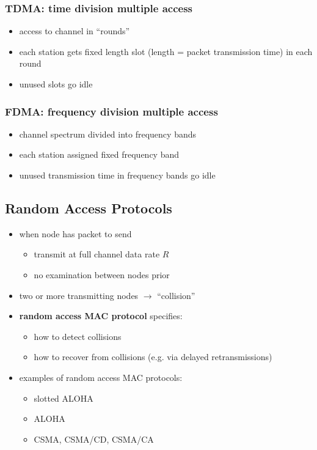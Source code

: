 \subsubsection{TDMA: time division multiple access}
\begin{itemize}
	\item access to channel in ``rounds''
	\item each station gets fixed length slot (length = packet transmission time) in each round
	\item unused slots go idle
\end{itemize}
\subsubsection{FDMA: frequency division multiple access}
\begin{itemize}
	\item channel spectrum divided into frequency bands
	\item each station assigned fixed frequency band
	\item unused transmission time in frequency bands go idle
\end{itemize}

\subsection{Random Access Protocols}
\begin{itemize}
	\item when node has packet to send
	\begin{itemize}
		\item transmit at full channel data rate $R$
		\item no examination between nodes prior
	\end{itemize}
	\item two or more transmitting nodes $\rightarrow$ ``collision''
	\item \textbf{random access MAC protocol} specifies:
	\begin{itemize}
		\item how to detect collisions
		\item how to recover from collisions (e.g. via delayed retransmissions)
	\end{itemize}
	\item examples of random access MAC protocols:
	\begin{itemize}
		\item slotted ALOHA
		\item ALOHA
		\item CSMA, CSMA/CD, CSMA/CA
	\end{itemize}
\end{itemize}
